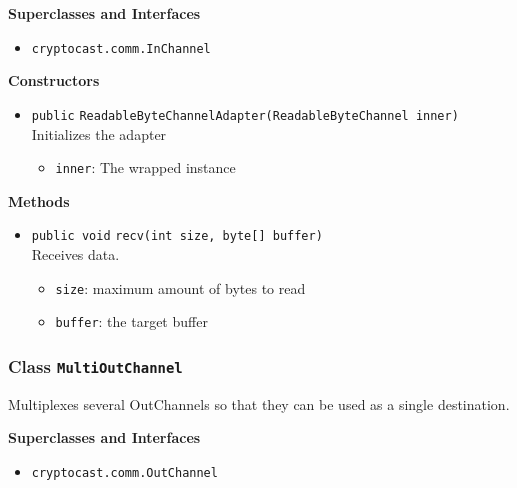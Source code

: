 \textbf{Superclasses and Interfaces}
\begin{itemize}
\item \lstinline|cryptocast.comm.InChannel|
\end{itemize}



\textbf{Constructors}
\begin{itemize}
\item \lstinline|public| \lstinline|ReadableByteChannelAdapter|\lstinline|(ReadableByteChannel inner)|\\
Initializes the adapter
\begin{itemize}
\item \lstinline|inner|: The wrapped instance
\end{itemize}



\end{itemize}


\textbf{Methods}
\begin{itemize}
\item \lstinline|public void| \lstinline|recv|\lstinline|(int size, byte[] buffer)|\\
Receives data.
\begin{itemize}
\item \lstinline|size|: maximum amount of bytes to read
\item \lstinline|buffer|: the target buffer
\end{itemize}



\end{itemize}

\subsubsection{Class \lstinline|MultiOutChannel|}
Multiplexes several OutChannels so that they can be used as a single
 destination. \\



\textbf{Superclasses and Interfaces}
\begin{itemize}
\item \lstinline|cryptocast.comm.OutChannel|
\end{itemize}



